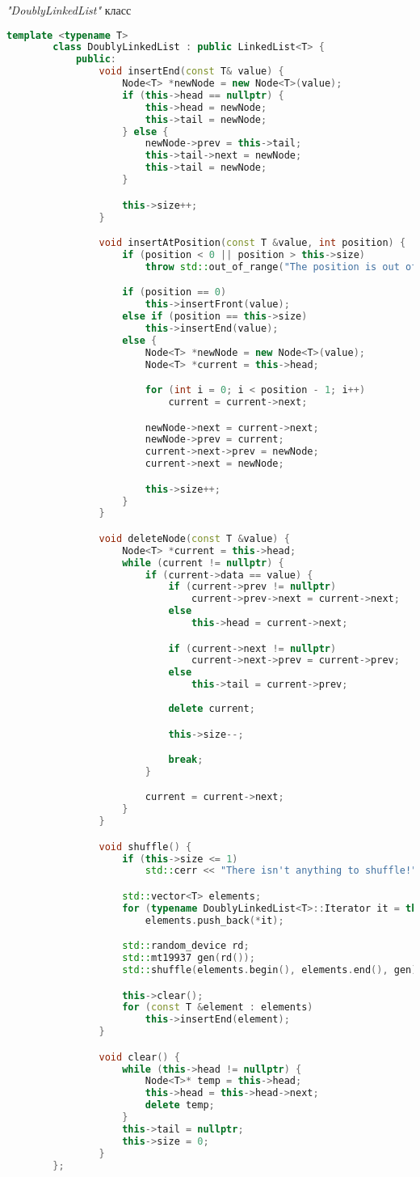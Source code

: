\documentclass[12pt, a4paper]{report}
\begin{document}
	\par
	\textit{"DoublyLinkedList"} класс
	\lstset{style=mystyle}
	\begin{lstlisting}[language=C++]
		template <typename T>
		class DoublyLinkedList : public LinkedList<T> {
			public:
				void insertEnd(const T& value) {
					Node<T> *newNode = new Node<T>(value);
					if (this->head == nullptr) {
						this->head = newNode;
						this->tail = newNode;
					} else {
						newNode->prev = this->tail;
						this->tail->next = newNode;
						this->tail = newNode;
					}

					this->size++;
				}

				void insertAtPosition(const T &value, int position) {
					if (position < 0 || position > this->size)
						throw std::out_of_range("The position is out of range.");

					if (position == 0)
						this->insertFront(value);
					else if (position == this->size)
						this->insertEnd(value);
					else {
						Node<T> *newNode = new Node<T>(value);
						Node<T> *current = this->head;

						for (int i = 0; i < position - 1; i++)
							current = current->next;

						newNode->next = current->next;
						newNode->prev = current;
						current->next->prev = newNode;
						current->next = newNode;

						this->size++;
					}
				}

				void deleteNode(const T &value) {
					Node<T> *current = this->head;
					while (current != nullptr) {
						if (current->data == value) {
							if (current->prev != nullptr)
								current->prev->next = current->next;
							else
								this->head = current->next;

							if (current->next != nullptr)
								current->next->prev = current->prev;
							else
								this->tail = current->prev;
							
							delete current;

							this->size--;

							break;
						}

						current = current->next;
					}
				}

				void shuffle() {
					if (this->size <= 1)
						std::cerr << "There isn't anything to shuffle!";

					std::vector<T> elements;
					for (typename DoublyLinkedList<T>::Iterator it = this->begin(); it != this->end(); ++it)
						elements.push_back(*it);

					std::random_device rd;
					std::mt19937 gen(rd());
					std::shuffle(elements.begin(), elements.end(), gen);

					this->clear();
					for (const T &element : elements)
						this->insertEnd(element);
				}

				void clear() {
					while (this->head != nullptr) {
						Node<T>* temp = this->head;
						this->head = this->head->next;
						delete temp;
					}
					this->tail = nullptr;
					this->size = 0;
				}
		};
	\end{lstlisting}
\end{document}
